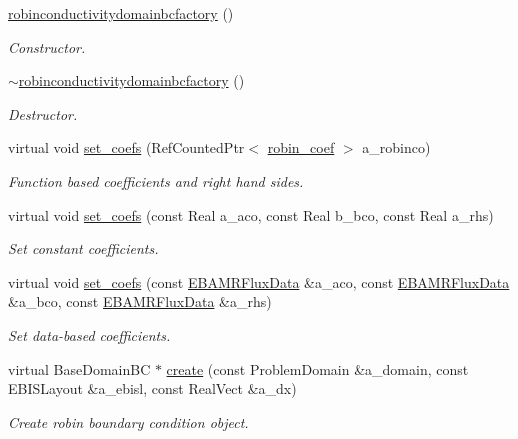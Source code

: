 \begin{DoxyCompactItemize}
\item 
\hyperlink{classrobinconductivitydomainbcfactory_afd51a944d6916615e1252f25c97ec6f6}{robinconductivitydomainbcfactory} ()
\begin{DoxyCompactList}\small\item\em Constructor. \end{DoxyCompactList}\item 
\hyperlink{classrobinconductivitydomainbcfactory_a9ad36ad55c20ef2315d5cd41e70acce3}{$\sim$robinconductivitydomainbcfactory} ()
\begin{DoxyCompactList}\small\item\em Destructor. \end{DoxyCompactList}\item 
virtual void \hyperlink{classrobinconductivitydomainbcfactory_a70ccfcfcf9d6cb5c82b7634226f5075c}{set\+\_\+coefs} (Ref\+Counted\+Ptr$<$ \hyperlink{classrobin__coef}{robin\+\_\+coef} $>$ a\+\_\+robinco)
\begin{DoxyCompactList}\small\item\em Function based coefficients and right hand sides. \end{DoxyCompactList}\item 
virtual void \hyperlink{classrobinconductivitydomainbcfactory_a6452c35e5cd558e9531268a2372da46e}{set\+\_\+coefs} (const Real a\+\_\+aco, const Real b\+\_\+bco, const Real a\+\_\+rhs)
\begin{DoxyCompactList}\small\item\em Set constant coefficients. \end{DoxyCompactList}\item 
virtual void \hyperlink{classrobinconductivitydomainbcfactory_a12ccbfd42a9d55d04638280fdc24d4be}{set\+\_\+coefs} (const \hyperlink{type__definitions_8H_aadad278b2e5d3d4abcf9032f90ba78c3}{E\+B\+A\+M\+R\+Flux\+Data} \&a\+\_\+aco, const \hyperlink{type__definitions_8H_aadad278b2e5d3d4abcf9032f90ba78c3}{E\+B\+A\+M\+R\+Flux\+Data} \&a\+\_\+bco, const \hyperlink{type__definitions_8H_aadad278b2e5d3d4abcf9032f90ba78c3}{E\+B\+A\+M\+R\+Flux\+Data} \&a\+\_\+rhs)
\begin{DoxyCompactList}\small\item\em Set data-\/based coefficients. \end{DoxyCompactList}\item 
virtual Base\+Domain\+BC $\ast$ \hyperlink{classrobinconductivitydomainbcfactory_a9a792d46ce1bf1935407658ade995acd}{create} (const Problem\+Domain \&a\+\_\+domain, const E\+B\+I\+S\+Layout \&a\+\_\+ebisl, const Real\+Vect \&a\+\_\+dx)
\begin{DoxyCompactList}\small\item\em Create robin boundary condition object. \end{DoxyCompactList}\end{DoxyCompactItemize}
